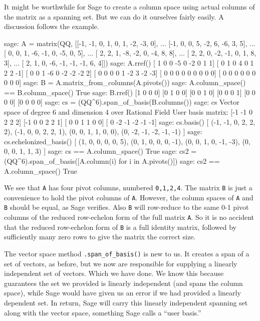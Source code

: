 It might be worthwhile for Sage to create a column space using actual columns of the matrix as a spanning set.  But we can do it ourselves fairly easily.  A discussion follows the example.
%
\begin{sageexample}
sage: A = matrix(QQ, [[-1, -1, 0,  1,  0,  1, -2, -3, 0],
...                   [-1,  0, 0,  5, -2,  6, -6,  3, 5],
...                   [ 0,  0, 1, -6, -1,  0, -5,  0, 5],
...                   [ 2,  2, 1, -8, -2,  0, -4,  8, 8],
...                   [ 2,  2, 0, -2, -1,  0,  1,  8, 3],
...                   [ 2,  1, 0, -6, -1, -1, -1,  6, 4]])
sage: A.rref()
[ 1  0  0 -5  0 -2  0  1  1]
[ 0  1  0  4  0  1  2  2 -1]
[ 0  0  1 -6  0 -2 -2 -2  2]
[ 0  0  0  0  1 -2  3 -2 -3]
[ 0  0  0  0  0  0  0  0  0]
[ 0  0  0  0  0  0  0  0  0]
sage: B = A.matrix_from_columns(A.pivots())
sage: A.column_space() == B.column_space()
True
sage: B.rref()
[1 0 0 0]
[0 1 0 0]
[0 0 1 0]
[0 0 0 1]
[0 0 0 0]
[0 0 0 0]
sage: cs = (QQ^6).span_of_basis(B.columns())
sage: cs
Vector space of degree 6 and dimension 4 over Rational Field
User basis matrix:
[-1 -1  0  2  2  2]
[-1  0  0  2  2  1]
[ 0  0  1  1  0  0]
[ 0 -2 -1 -2 -1 -1]
sage: cs.basis()
[
(-1, -1, 0, 2, 2, 2),
(-1, 0, 0, 2, 2, 1),
(0, 0, 1, 1, 0, 0),
(0, -2, -1, -2, -1, -1)
]
sage: cs.echelonized_basis()
[
(1, 0, 0, 0, 0, 5),
(0, 1, 0, 0, 0, -1),
(0, 0, 1, 0, -1, -3),
(0, 0, 0, 1, 1, 3)
]
sage: cs == A.column_space()
True
sage: cs2 = (QQ^6).span_of_basis([A.column(i) for i in A.pivots()])
sage: cs2 == A.column_space()
True
\end{sageexample}
%
We see that \verb?A? has four pivot columns, numbered \verb?0,1,2,4?.  The matrix \verb?B? is just a convenience to hold the pivot columns of \verb?A?.  However, the column spaces of \verb?A? and \verb?B? should be equal, as Sage verifies.  Also \verb?B? will row-reduce to the same 0-1 pivot columns of the reduced row-echelon form of the full matrix \verb?A?.  So it is no accident that the reduced row-echelon form of \verb?B? is a full identity matrix, followed by sufficiently many zero rows to give the matrix the correct size.\par
%
The vector space method \verb?.span_of_basis()? is new to us.  It creates a span of a set of vectors, as before, but we now are responsible for supplying a linearly independent set of vectors.  Which we have done.  We know this because  guarantees the set we provided is linearly independent (and spans the column space), while Sage would have given us an error if we had provided a linearly dependent set.  In return, Sage will carry this linearly independent spanning set along with the vector space, something Sage calls a ``user basis.''\par
